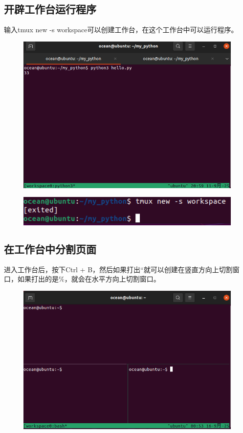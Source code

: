 \documentclass{article}
\begin{document}
\subsection{开辟工作台运行程序}
输入tmux new -s workspace可以创建工作台，在这个工作台中可以运行程序。
\begin{figure}[H]
    \centering
    \includegraphics[width=1\linewidth]{tmux0.png}
\end{figure}
\begin{figure}[H]
    \centering
    \includegraphics[width=1\linewidth]{tmux.png}
\end{figure}

\newpage
\subsection{在工作台中分割页面}
进入工作台后，按下Ctrl + B，然后如果打出“就可以创建在竖直方向上切割窗口，如果打出的是\%，就会在水平方向上切割窗口。
\begin{figure}[H]
    \centering
    \includegraphics[width=1\linewidth]{split.png}
\end{figure}
\end{document}
